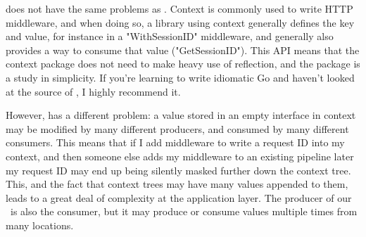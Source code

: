 \documentclass{article}
\begin{document}
 does not have the same problems as .
Context is commonly used to write HTTP middleware, and when doing so, a library
using context generally defines the key and value, for instance in a
"WithSessionID" middleware, and generally also provides a way to consume that
value ("GetSessionID").
This API means that the context package does not need to make heavy use of
reflection, and the package is a study in simplicity.
If you're learning to write idiomatic Go and haven't looked at the source of
, I highly recommend it.

However,  has a different problem: a value stored in an empty
interface in context may be modified by many different producers, and consumed
by many different consumers.
This means that if I add middleware to write a request ID into my context, and
then someone else adds my middleware to an existing pipeline later my request
ID may end up being silently masked further down the context tree.
This, and the fact that context trees may have many values appended to them,
leads to a great deal of complexity at the application layer.
The producer of our \interface\ is also the consumer, but it may produce or
consume values multiple times from many locations.
\end{document}
